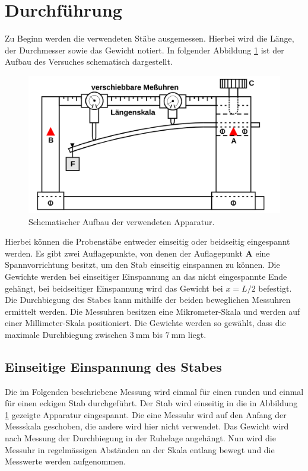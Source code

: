 \section{Durchführung}
\label{sec:Durchführung}
Zu Beginn werden die verwendeten Stäbe ausgemessen. Hierbei wird die Länge, der
Durchmesser sowie das Gewicht notiert.
In folgender Abbildung \ref{fig:aufbau} ist der Aufbau des Versuches schematisch dargestellt.
\begin{figure}[H]
  \centering
  \includegraphics[scale=0.3]{content/versuchsaufbau.png}
  \caption{Schematischer Aufbau der verwendeten Apparatur. \cite{AP01}}
  \label{fig:aufbau}
\end{figure}
\noindent
Hierbei können die Probenstäbe entweder einseitig oder beidseitig eingespannt
werden. Es gibt zwei Auflagepunkte, von denen der Auflagepunkt \textbf{A} eine
Spannvorrichtung besitzt, um den Stab einseitig einspannen zu können.
Die Gewichte werden bei einseitiger Einspannung an das nicht eingespannte
Ende gehängt, bei beidseitiger Einspannung wird das Gewicht bei $x = L/2$ befestigt.
Die Durchbiegung des Stabes kann mithilfe der beiden beweglichen Messuhren ermittelt werden.
Die Messuhren besitzen eine Mikrometer-Skala und werden auf einer Millimeter-Skala positioniert.
Die Gewichte werden so gewählt, dass die maximale Durchbiegung zwischen $\SI{3}{\milli\meter}$ bis
$\SI{7}{\milli\meter}$ liegt.

\subsection{Einseitige Einspannung des Stabes}
Die im Folgenden beschriebene Messung wird einmal für einen runden und einmal für
einen eckigen Stab durchgeführt. Der Stab wird einseitig in die in Abbildung \ref{fig:aufbau}
gezeigte Apparatur eingespannt. Die eine Messuhr wird auf den Anfang der Messskala
geschoben, die andere wird hier nicht verwendet. Das Gewicht wird nach Messung der
Durchbiegung in der Ruhelage angehängt. Nun wird die Messuhr in regelmässigen Abständen
an der Skala entlang bewegt und die Messwerte werden aufgenommen.

